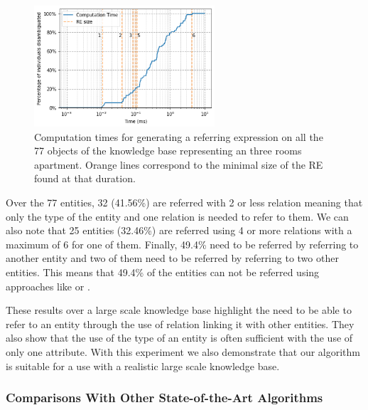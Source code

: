 \documentclass[a4paper,11pt,twoside]{StyleThese}
\begin{document}
\begin{figure}[hbtp]
\centering
\includegraphics[width=0.6\textwidth]{figures/chapter3/scalingupREG.png}
\caption{Computation times for generating a referring expression on all the 77 objects of the knowledge base representing an three rooms apartment. Orange lines correspond to the minimal size of the RE found at that duration.}
\label{fig:scalingup}
\end{figure}

Over the 77 entities, 32 (41.56\%) are referred with 2 or less relation meaning that only the type of the entity and one relation is needed to refer to them. We can also note that 25 entities (32.46\%) are referred using 4 or more relations with a maximum of 6 for one of them. Finally, 49.4\% need to be referred by referring to another entity and two of them need to be referred by referring to two other entities. This means that 49.4\% of the entities can not be referred using approaches like \cite{ros2010one} or \cite{dale1995computational}.

These results over a large scale knowledge base highlight the need to be able to refer to an entity through the use of relation linking it with other entities. They also show that the use of the type of an entity is often sufficient with the use of only one attribute. With this experiment we also demonstrate that our algorithm is suitable for a use with a realistic large scale knowledge base.

\subsubsection{Comparisons With Other State-of-the-Art Algorithms}
\label{subsubsec:REGcomparisons}
\end{document}
